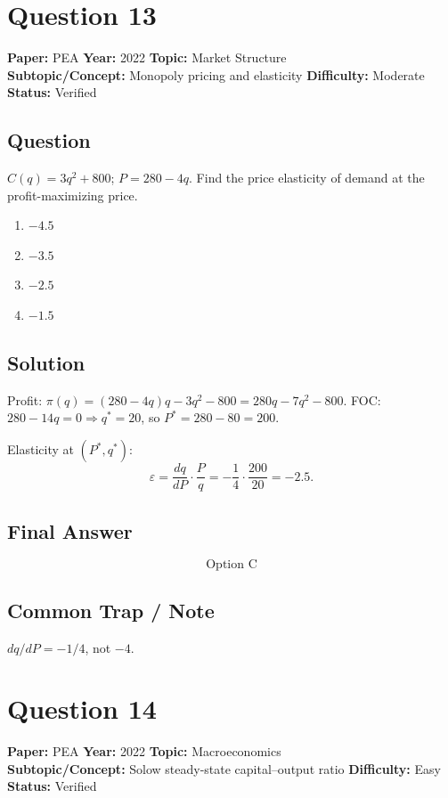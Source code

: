 \documentclass[11pt]{article}
\begin{document}
\section*{Question 13}
\textbf{Paper:} PEA \quad \textbf{Year:} 2022 \quad \textbf{Topic:} Market Structure \\
\textbf{Subtopic/Concept:} Monopoly pricing and elasticity \quad \textbf{Difficulty:} Moderate \\
\textbf{Status:} Verified

\subsection*{Question}
$C(q) = 3q^2 + 800$; $P = 280 - 4q$. Find the price elasticity of demand at the
profit-maximizing price.
\begin{enumerate}[label=(\Alph*)]
\item $-4.5$
\item $-3.5$
\item $-2.5$
\item $-1.5$
\end{enumerate}

\subsection*{Solution}
Profit: $\pi(q) = (280 - 4q)q - 3q^2 - 800 = 280q - 7q^2 - 800$.
FOC: $280 - 14q = 0 \Rightarrow q^* = 20$, so $P^* = 280 - 80 = 200$.

Elasticity at $(P^*, q^*)$:
\[
\varepsilon = \frac{dq}{dP} \cdot \frac{P}{q} = -\frac{1}{4} \cdot \frac{200}{20} = -2.5.
\]

\subsection*{Final Answer}
\[
\boxed{\text{Option C}}
\]

\subsection*{Common Trap / Note}
$dq/dP = -1/4$, not $-4$.

\section*{Question 14}
\textbf{Paper:} PEA \quad \textbf{Year:} 2022 \quad \textbf{Topic:} Macroeconomics \\
\textbf{Subtopic/Concept:} Solow steady-state capital--output ratio \quad \textbf{Difficulty:} Easy \\
\textbf{Status:} Verified
\end{document}
